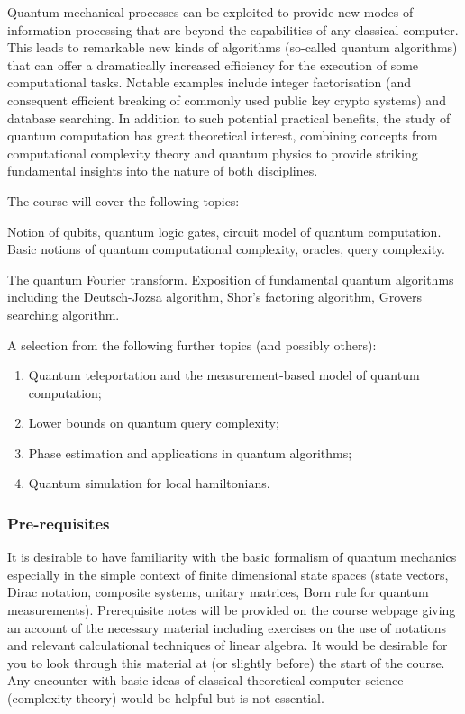 \documentclass[a4paper]{article}
\begin{document}
\maketitle
{\small
\setlength{\parindent}{0em}
\setlength{\parskip}{1em}

Quantum mechanical processes can be exploited to provide new modes of information processing that are beyond the capabilities of any classical computer. This leads to remarkable new kinds of algorithms (so-called quantum algorithms) that can offer a dramatically increased efficiency for the execution of some computational tasks. Notable examples include integer factorisation (and consequent efficient breaking of commonly used public key crypto systems) and database searching. In addition to such potential practical benefits, the study of quantum computation has great theoretical interest, combining concepts from computational complexity theory and quantum physics to provide striking fundamental insights into the nature of both disciplines.

The course will cover the following topics:

Notion of qubits, quantum logic gates, circuit model of quantum computation. Basic notions of quantum computational complexity, oracles, query complexity.

The quantum Fourier transform. Exposition of fundamental quantum algorithms including the Deutsch-Jozsa algorithm, Shor's factoring algorithm, Grovers searching algorithm.

A selection from the following further topics (and possibly others):
\begin{enumerate}
  \item Quantum teleportation and the measurement-based model of quantum computation;
  \item Lower bounds on quantum query complexity;
  \item Phase estimation and applications in quantum algorithms;
  \item Quantum simulation for local hamiltonians.
\end{enumerate}

\subsubsection*{Pre-requisites}
It is desirable to have familiarity with the basic formalism of quantum mechanics especially in the simple context of finite dimensional state spaces (state vectors, Dirac notation, composite systems, unitary matrices, Born rule for quantum measurements). Prerequisite notes will be provided on the course webpage giving an account of the necessary material including exercises on the use of notations and relevant calculational techniques of linear algebra. It would be desirable for you to look through this material at (or slightly before) the start of the course. Any encounter with basic ideas of classical theoretical computer science (complexity theory) would be helpful but is not essential.
}
\tableofcontents
\end{document}
